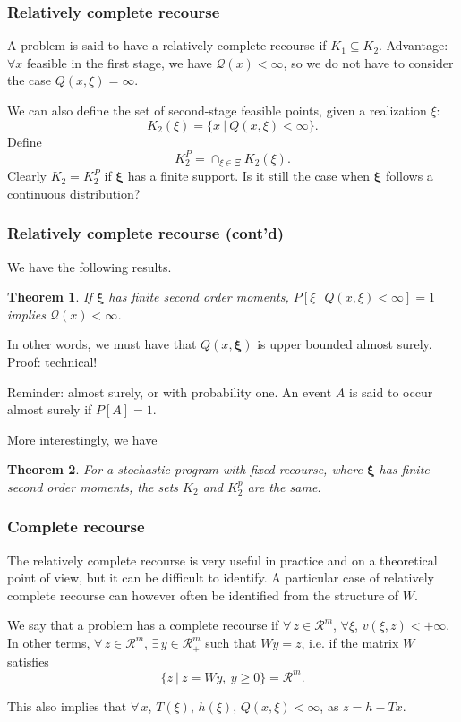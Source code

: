 \documentclass{beamer}
\newtheorem{theo}{Theorem}
\def\bxi{\boldsymbol\xi}
\def\bxi{\boldsymbol\xi}
\def\rit{\mathcal{R}}
\begin{document}
\begin{frame}
\frametitle{Relatively complete recourse}

A problem is said to have a {\red relatively complete recourse} if $K_1
\subseteq K_2$.
Advantage: $\forall x$ feasible in the first stage, we have $\mathcal{Q}(x) < \infty$, so we do not have to consider the case $Q(x, \xi) = \infty$.

\mbox{}

We can also define the set of second-stage feasible points, given a realization $\xi$:
\[
K_2(\xi) = \lbrace x \ |\ Q(x,\xi) < \infty \rbrace.
\]
Define
\[
K_2^P = \cap_{\xi \in \Xi} K_2(\xi).
\]
Clearly $K_2 = K_2^P$ if $\bxi$ has a finite support.
Is it still the case when $\bxi$ follows a continuous distribution?

\end{frame}

\begin{frame}
\frametitle{Relatively complete recourse (cont'd)}

We have the following results.

\begin{theo}
If $\bxi$ has finite second order moments, $P[ \xi \ |\ Q(x,\xi) < \infty] = 1$ implies $\mathcal{Q}(x) < \infty$.
\end{theo}

In other words, we must have that $Q(x,\bxi)$ is upper bounded almost surely. Proof: technical!

\mbox{}

Reminder: almost surely, or with probability one. An event $A$ is said to occur almost surely if $P[A] = 1$.

\mbox{}

More interestingly, we have
\begin{theo}
For a stochastic program with fixed recourse, where $\bxi$ has finite second order moments, the sets $K_2$ and $K_2^p$ are the same.
\end{theo}

\end{frame}

\begin{frame}
\frametitle{Complete recourse}

The relatively complete recourse is very useful in practice and on a theoretical point of view, but it can be difficult to identify.
A particular case of relatively complete recourse can however often be identified from the structure of $W$.

\mbox{}

We say that a problem has a {\red complete recourse} if $\forall\, z \in \rit^m$, $\forall \xi$, $v(\xi, z) < +\infty$. In other terms, $\forall\, z \in \rit^m$, $\exists\, y \in \rit_+^m$ such that $Wy = z$, i.e. if the matrix $W$ satisfies
\[
\lbrace z \ |\ z=Wy,\ y \geq 0 \rbrace = \rit^m.
\]

\mbox{}

This also implies that $\forall\, x$, $T(\xi)$, $h(\xi)$, $Q(x,\xi) < \infty$, as $z = h-Tx$.

\end{frame}
\end{document}
